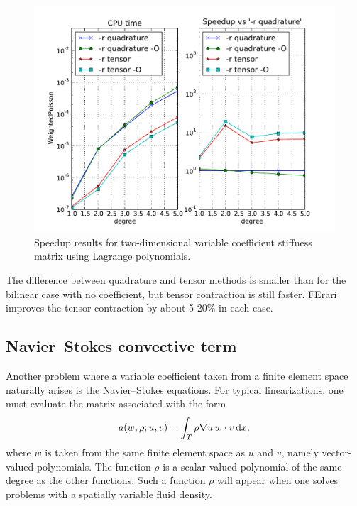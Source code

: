 \begin{figure}
  \centering
  \includegraphics[width=\largefig]{chapters/kirby-3/pdf/WeightedPoisson.pdf}
  \caption{Speedup results for two-dimensional variable coefficient
    stiffness matrix using Lagrange polynomials.}
  \label{fig:WeightedPoisson}
\end{figure}
The difference between quadrature and tensor methods is smaller than
for the bilinear case with no coefficient, but tensor contraction is
still faster. FErari improves the tensor contraction by about 5-20\%
in each case.

\subsection{Navier--Stokes convective term}

Another problem where a variable coefficient taken from a finite
element space naturally arises is the Navier--Stokes equations. For
typical linearizations, one must evaluate the matrix associated with
the form
\begin{equation}
  a(w, \rho; u, v) = \int_T \rho \nabla u \, w \cdot v \, \mathrm{d}x,
\end{equation}
where $ w $ is taken from the same finite element space as $ u $ and $
v $, namely vector-valued polynomials. The function $ \rho $ is a
scalar-valued polynomial of the same degree as the other
functions. Such a function $ \rho $ will appear when one solves
problems with a spatially variable fluid density.

